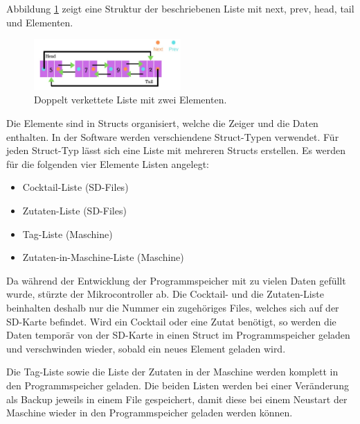 Abbildung \ref{fig:Doubly_Linked_List_2_00} zeigt eine Struktur der beschriebenen Liste mit next, prev, head, tail und Elementen.

\begin{figure}[h!]
	\centering
	\includegraphics[width=0.5\textwidth]{graphics/Doubly_Linked_List_2_00}
	\caption{Doppelt verkettete Liste mit zwei Elementen.\cite{yadav_circular_2019}}
	\label{fig:Doubly_Linked_List_2_00}
\end{figure}


Die Elemente sind in Structs organisiert, welche die Zeiger und die Daten enthalten. In der Software werden verschiendene Struct-Typen verwendet. Für jeden Struct-Typ lässt sich eine Liste mit mehreren Structs erstellen. Es werden für die folgenden vier Elemente Listen angelegt:

\begin{itemize}
\item Cocktail-Liste (SD-Files)
\item Zutaten-Liste (SD-Files)
\item Tag-Liste (Maschine)
\item Zutaten-in-Maschine-Liste (Maschine)
\end{itemize}

Da während der Entwicklung der Programmspeicher mit zu vielen Daten gefüllt wurde, stürzte der Mikrocontroller ab. Die Cocktail- und die Zutaten-Liste beinhalten deshalb nur die Nummer ein zugehöriges Files, welches sich auf der SD-Karte befindet. Wird ein Cocktail oder eine Zutat benötigt, so werden die Daten temporär von der SD-Karte in einen Struct im Programmspeicher geladen und verschwinden wieder, sobald ein neues Element geladen wird.

Die Tag-Liste sowie die Liste der Zutaten in der Maschine werden komplett in den Programmspeicher geladen. Die beiden Listen werden bei einer Veränderung als Backup jeweils in einem File gespeichert, damit diese bei einem Neustart der Maschine wieder in den Programmspeicher geladen werden können.